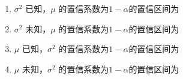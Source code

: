 \begin{proposition}[单个总体参数的置信区间]\label{prop:单个总体参数的置信区间}
    \begin{enumerate}
    \item $\sigma^2$ 已知，$\mu$ 的置信系数为$1-\alpha$的置信区间为
    \begin{equation}
        [\bar{X} - \frac{\sigma}{\sqrt{n}}u_{\alpha/2}, \bar{X} + \frac{\sigma}{\sqrt{n}}u_{\alpha/2}]
    \end{equation}
    \item $\sigma^2$ 未知，$\mu$ 的置信系数为$1-\alpha$的置信区间为
    \begin{equation}
        [\bar{X} - \frac{S}{\sqrt{n}}t_{n-1}(\alpha/2), \bar{X} + \frac{S}{\sqrt{n}}t_{n-1}(\alpha/2)]
    \end{equation}
    \item $\mu$ 已知，$\sigma^2$ 的置信系数为$1-\alpha$的置信区间为
    \begin{equation}
        [\frac{nS_\mu^2}{\chi_n^2(\alpha/2)},\frac{nS_\mu^2}{\chi_n^2(1-\alpha/2)}]
    \end{equation}
    \item $\mu$ 未知，$\sigma^2$ 的置信系数为$1-\alpha$的置信区间为
    \begin{equation}
        [\frac{(n-1)S^2}{\chi_{n-1}^2(\alpha/2)},\frac{(n-1)S^2}{\chi_{n-1}^2(1-\alpha/2)}]
    \end{equation}
\end{enumerate}
\end{proposition}

